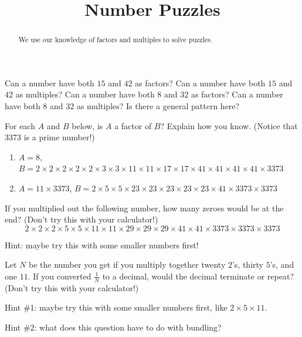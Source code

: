 \documentclass[nooutcomes,noauthor,handout]{ximera}
\title{Number Puzzles}
\begin{document}
\begin{abstract} We use our knowledge of factors and multiples to solve puzzles. \end{abstract}
\maketitle


\begin{problem}
Can a number have both $15$ and $42$ as factors? Can a number have both $15$ and $42$ as multiples? Can a number have both $8$ and $32$ as factors? Can a number have both $8$ and $32$ as multiples? Is there a general pattern here?
\vskip 0.5in
\end{problem}


\begin{problem}
For each $A$ and $B$ below, is $A$ a factor of $B$? Explain how you know. (Notice that 3373 is a prime number!)
\begin{enumerate}
\item $A = 8$, $B = 2 \times 2 \times 2 \times 2 \times 2 \times 3 \times 3 \times 11 \times 11 \times 17 \times 17 \times 41 \times 41 \times 41 \times 41  \times 3373$
\item $A = 11 \times 3373$, $B = 2 \times 5 \times 5 \times 23 \times 23 \times 23 \times 23 \times 23 \times 41 \times 3373 \times 3373$
\end{enumerate}

\vskip 0.5in
\end{problem}


\begin{problem}
If you multiplied out the following number, how many zeroes would be at the end? (Don't try this with your calculator!)
\[
2 \times 2 \times 2 \times 5 \times 5 \times 11 \times 11 \times 29 \times 29 \times 29 \times 41 \times 41 \times 3373 \times 3373 \times 3373
\]
\vskip 0.5in

Hint: maybe try this with some smaller numbers first!
\vskip 0.5in
\end{problem}



\begin{problem}
Let $N$ be the number you get if you multiply together twenty $2$'s, thirty $5$'s, and one $11$. If you converted $\frac{1}{N}$ to a decimal, would the decimal terminate or repeat? (Don't try this with your calculator!)
\vskip 0.5in

Hint \#1: maybe try this with some smaller numbers first, like $2 \times 5 \times 11$.

Hint \#2: what does this question have to do with bundling?
\vskip 0.5in
\end{problem}
\end{document}
